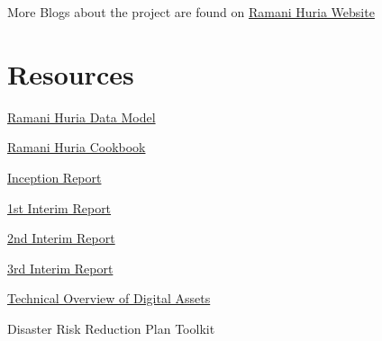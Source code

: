 \documentclass[a4paper,12pt,twoside]{article}
\begin{document}
More Blogs about the project are found on \href{http://ramanihuria.org/news/}{Ramani Huria Website}

\newpage
\section{Resources}

\href{https://wiki.openstreetmap.org/wiki/Dar_es_Salaam/Ramani_Huria}{Ramani Huria Data Model}

\href{https://drive.google.com/file/d/1M0jcJHxdIDlrCRr09c4G8ZVlvl43j_1b/view}{Ramani Huria Cookbook}

\href{https://docs.google.com/document/d/1PwHRtdRvOfeEhpsIl-gpQXTTDoVwW_0--wRsmeUhVt4/edit#}{Inception Report}

\href{https://docs.google.com/document/d/1oW4y4ZT76viHu_sDnrBYrFsJfu_a0CAn9GLIxmG_rpc/edit}{1st Interim Report}

\href{https://docs.google.com/document/d/1Zn35NGLn2n-X93Z2hwiWwQwUnMljCoD7hwTUrTEXxTg/edit}{2nd Interim Report}

\href{https://docs.google.com/document/d/1D03BG5Pkmo0XMIyrvvgVLqdeyfkmwxRRs3UQdekNspk/edit}{3rd Interim Report}

\href{https://docs.google.com/document/d/1Cc-ztcmc53LqlqhAXC1neCyxuRJujN16nhcibMg04qw/edit}{Technical Overview of Digital Assets}

Disaster Risk Reduction Plan Toolkit
\end{document}
